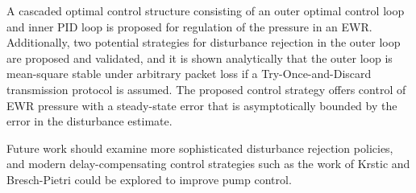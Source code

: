 A cascaded optimal control structure consisting of an outer optimal control loop and inner PID loop is proposed for regulation of the pressure in an EWR. Additionally, two potential strategies for disturbance rejection in the outer loop are proposed and validated, and it is shown analytically that the outer loop is mean-square stable under arbitrary packet loss if a Try-Once-and-Discard transmission protocol is assumed. The proposed control strategy offers control of EWR pressure with a steady-state error that is asymptotically bounded by the error in the disturbance estimate.

Future work should examine more sophisticated disturbance rejection policies, and modern delay-compensating control strategies such as the work of Krstic and Bresch-Pietri \cite{Bresch-Pietri2010} could be explored to improve pump control.